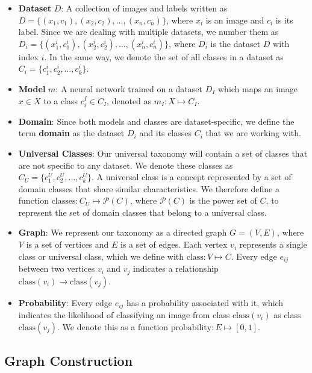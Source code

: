 \begin{itemize}
    \item \textbf{Dataset} $D$: A collection of images and labels
          written as $D = \{(x_1, c_1), (x_2, c_2), \ldots, (x_n, c_n)\}$,
          where $x_i$ is an image and $c_i$ is its label.
          Since we are dealing with multiple datasets, we number them
          as $D_i = \{(x_1^i, c_1^i), (x_2^i, c_2^i), \ldots, (x_n^i, c_n^i)\}$,
          where $D_i$ is the dataset $D$ with index $i$.
          In the same way, we denote the set of all classes in a dataset as $C_i = \{c_1^i, c_2^i, \ldots, c_k^i\}$.
    \item \textbf{Model} $m$: A neural network trained on a dataset $D_I$
          which maps an image $x\in X$ to a class $c_i^I\in C_I$, denoted as $m_I: X \mapsto C_I$.
    \item \textbf{Domain}: Since both models and classes are dataset-specific,
          we define the term \textbf{domain} as the dataset $D_i$ and its classes $C_i$
          that we are working with.
    \item \textbf{Universal Classes}: Our universal taxonomy will contain a set of classes
          that are not specific to any dataset.
          We denote these classes as $C_U = \{c_1^U, c_2^U, \ldots, c_k^U\}$.
          A universal class is a concept represented by a set of domain classes
          that share similar characteristics. We therefore define a function
          $\text{classes}: C_U \mapsto \mathcal{P}(C)$, where $\mathcal{P}(C)$ is the power set of $C$,
          to represent the set of domain classes that belong to a universal class.
    \item \textbf{Graph}: We represent our taxonomy as a directed graph $G = (V, E)$,
          where $V$ is a set of vertices and $E$ is a set of edges.
          Each vertex $v_i$ represents a single class or universal class,
          which we define with $\text{class}: V \mapsto C$.
          Every edge $e_{ij}$ between two vertices $v_i$ and $v_j$ indicates
          a relationship $\text{class}(v_i) \rightarrow \text{class}(v_j)$.
    \item \textbf{Probability}: Every edge $e_{ij}$ has a probability associated with it,
          which indicates the likelihood of classifying an image from class $\text{class}(v_i)$
          as class $\text{class}(v_j)$.
          We denote this as a function $\text{probability}: E \mapsto [0, 1]$.
\end{itemize}

\subsection{Graph Construction}

